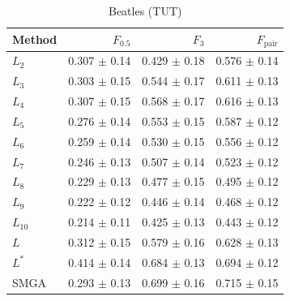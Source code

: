\documentclass{article}
\begin{document}
\begin{table}
\centering
\caption{Beatles (TUT)\label{results:beatles}}
\small
\begin{tabular}{lrrr}
\toprule
Method & $F_{0.5}$ & $F_3$ & $F_\text{pair}$\\
\midrule
$L_2$   & 0.307 $\pm$ 0.14 & 0.429 $\pm$ 0.18   & 0.576 $\pm$ 0.14\\
$L_3$   & 0.303 $\pm$ 0.15 & 0.544 $\pm$ 0.17   & 0.611 $\pm$ 0.13\\
$L_4$   & 0.307 $\pm$ 0.15 & 0.568 $\pm$ 0.17   & 0.616 $\pm$ 0.13\\
$L_5$   & 0.276 $\pm$ 0.14 & 0.553 $\pm$ 0.15   & 0.587 $\pm$ 0.12\\
$L_6$   & 0.259 $\pm$ 0.14 & 0.530 $\pm$ 0.15   & 0.556 $\pm$ 0.12\\
$L_7$   & 0.246 $\pm$ 0.13 & 0.507 $\pm$ 0.14   & 0.523 $\pm$ 0.12\\
$L_8$   & 0.229 $\pm$ 0.13 & 0.477 $\pm$ 0.15   & 0.495 $\pm$ 0.12\\
$L_9$   & 0.222 $\pm$ 0.12 & 0.446 $\pm$ 0.14   & 0.468 $\pm$ 0.12\\
$L_{10}$& 0.214 $\pm$ 0.11 & 0.425 $\pm$ 0.13   & 0.443 $\pm$ 0.12\\
\midrule
$L$     & 0.312 $\pm$ 0.15 & 0.579 $\pm$ 0.16   & 0.628 $\pm$ 0.13\\
$L^*$   & 0.414 $\pm$ 0.14 & 0.684 $\pm$ 0.13   & 0.694 $\pm$ 0.12\\
\midrule
SMGA    & 0.293 $\pm$ 0.13 & 0.699 $\pm$ 0.16   & 0.715 $\pm$ 0.15\\
\bottomrule
\end{tabular}
\end{table}
\end{document}
